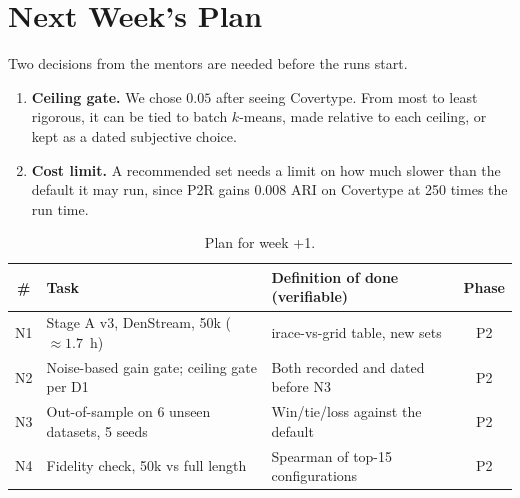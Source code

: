 \section{Next Week's Plan}
\label{sec:next}

Two decisions from the mentors are needed before the runs start.
\begin{enumerate}[label=\textbf{D\arabic*.},leftmargin=2.2em,itemsep=1pt,topsep=2pt]
  \item \textbf{Ceiling gate.} We chose $0.05$ after seeing Covertype. From most to least rigorous, it can be tied to batch $k$-means, made relative to each ceiling, or kept as a dated subjective choice.
  \item \textbf{Cost limit.} A recommended set needs a limit on how much slower than the default it may run, since P2R gains $0.008$ ARI on Covertype at 250 times the run time.
\end{enumerate}

\begin{table}[H]
\centering
\caption{Plan for week \number\numexpr\WeekNo+1\relax.}
\label{tab:next}
\small
\begin{tabularx}{\textwidth}{@{}c L L c@{}}
\toprule
\textbf{\#} & \textbf{Task} & \textbf{Definition of done (verifiable)} & \textbf{Phase} \\
\midrule
N1 & Stage A v3, DenStream, 50k ($\approx 1.7$~h) & irace-vs-grid table, new sets & P2 \\
N2 & Noise-based gain gate; ceiling gate per D1 & Both recorded and dated before N3 & P2 \\
N3 & Out-of-sample on 6 unseen datasets, 5 seeds & Win/tie/loss against the default & P2 \\
N4 & Fidelity check, 50k vs full length & Spearman of top-15 configurations & P2 \\
\bottomrule
\end{tabularx}
\end{table}
